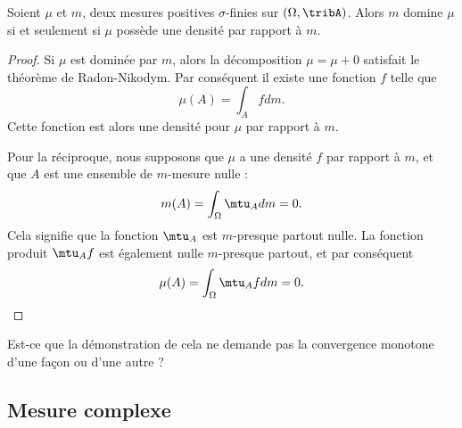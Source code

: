 \begin{corollary}       \label{CorDomDens}
    Soient \( \mu\) et \( m\), deux mesures positives \( \sigma\)-finies sur \( (\Omega,\tribA)\). Alors \( m\) domine \( \mu\) si et seulement si \( \mu\) possède une densité par rapport à \( m\).
\end{corollary}
 
\begin{proof}
    Si \( \mu\) est dominée par \( m\), alors la décomposition \( \mu=\mu+0\) satisfait le théorème de Radon-Nikodym. Par conséquent il existe une fonction \( f\) telle que
    \begin{equation}
        \mu(A)=\int_Afdm.
    \end{equation}
    Cette fonction est alors une densité pour \( \mu\) par rapport à \( m\).

    Pour la réciproque, nous supposons que \( \mu\) a une densité \( f\) par rapport à \( m\), et que \( A\) est une ensemble de \( m\)-mesure nulle :
    \begin{equation}
        m(A)=\int_{\Omega}\mtu_Adm=0.
    \end{equation}
    Cela signifie que la fonction \( \mtu_A\) est \( m\)-presque partout nulle. La fonction produit \( \mtu_Af\) est également nulle \( m\)-presque partout, et par conséquent
    \begin{equation}
        \mu(A)=\int_{\Omega}\mtu_Afdm=0.
    \end{equation}
\end{proof}

\begin{probleme}
    Est-ce que la démonstration de cela ne demande pas la convergence monotone d'une façon ou d'une autre ?
\end{probleme}

\subsection{Mesure complexe}

